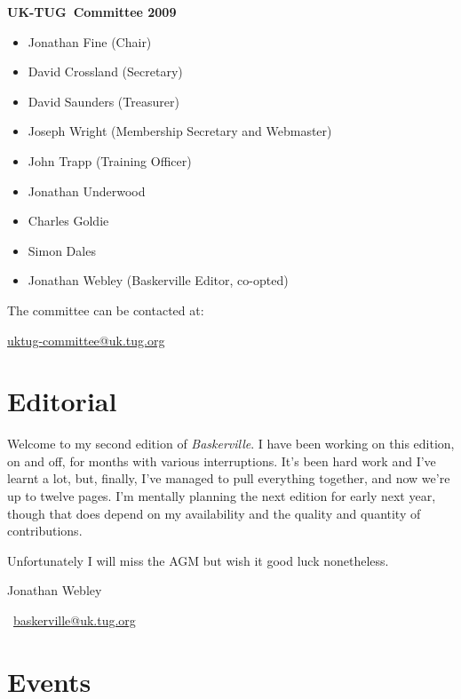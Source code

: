 \documentclass[a4paper,twoside,twocolumn]{article}
\def \ukt {UK-TUG}
\newcommand{\BV}{\textit{Baskerville}}
\begin{document}
\vspace{0.5cm}
\noindent \textbf{\ukt\ Committee 2009}

\begin{itemize}
   \setlength{\parskip}{1pt} %
   \item Jonathan Fine (Chair)
   \item David Crossland (Secretary)
   \item David Saunders (Treasurer)
   \item Joseph Wright (Membership Secretary and Webmaster)
   \item John Trapp (Training Officer)
   \item Jonathan Underwood
   \item Charles Goldie
   \item Simon Dales
   \item Jonathan Webley (Baskerville Editor, co-opted)
\end{itemize}
The  committee can be contacted at:
\begin{center}
\href{mailto:uktug-committee@uk.tug.org}{uktug-committee@uk.tug.org}
\end{center}

\section{Editorial}
Welcome to my second edition of \BV. I have been working on this edition, on and off, for months with various interruptions. It's been hard work and I've learnt a lot, but, finally, I've managed to pull everything together, and now we're up to twelve pages. I'm mentally planning the next edition for early next year, though that does depend on my availability and the quality and quantity of contributions.

Unfortunately I will miss the AGM but wish it good luck nonetheless.

\hfill Jonathan Webley

\hfill \ \href{mailto:baskerville@uk.tug.org}{baskerville@uk.tug.org}

\section{Events}
\end{document}
